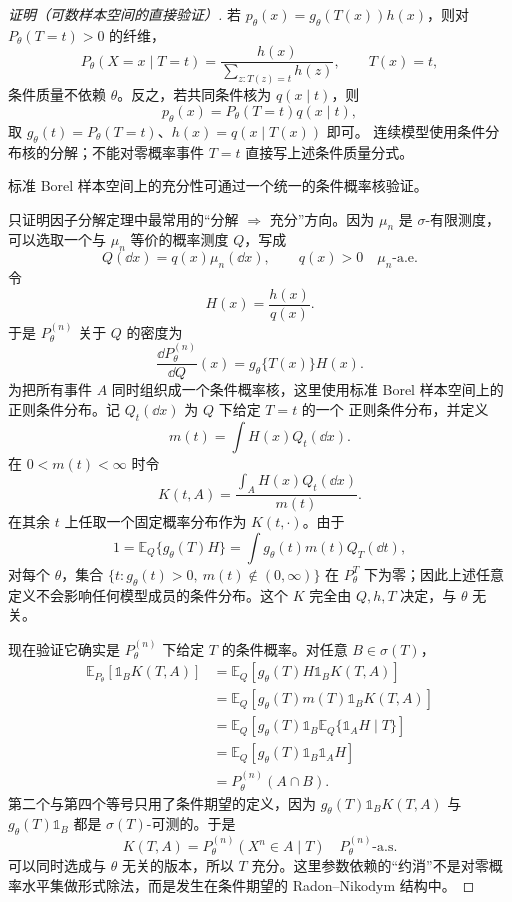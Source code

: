 \begin{proof}[证明（可数样本空间的直接验证）]
若 $p_\theta(x)=g_\theta(T(x))h(x)$，则对 $P_\theta(T=t)>0$ 的纤维，
\[
 P_\theta(X=x\mid T=t)=\frac{h(x)}{\sum_{z:T(z)=t}h(z)},\qquad T(x)=t,
\]
条件质量不依赖 $\theta$。反之，若共同条件核为 $q(x\mid t)$，则
\[
 p_\theta(x)=P_\theta(T=t)q(x\mid t),
\]
取 $g_\theta(t)=P_\theta(T=t)$、$h(x)=q(x\mid T(x))$ 即可。
连续模型使用条件分布核的分解；不能对零概率事件 $T=t$ 直接写上述条件质量分式。

标准 Borel 样本空间上的充分性可通过一个统一的条件概率核验证。

只证明因子分解定理中最常用的“分解 $\Rightarrow$ 充分”方向。因为 $\mu_n$ 是 $\sigma$-有限测度，可以选取一个与 $\mu_n$ 等价的概率测度 $Q$，写成
\[
 Q(\dd x)=q(x)\mu_n(\dd x),
 \qquad q(x)>0\quad \mu_n\text{-a.e.}
\]
令
\[
 H(x)=\frac{h(x)}{q(x)}.
\]
于是 $P_\theta^{(n)}$ 关于 $Q$ 的密度为
\[
 \frac{\dd P_\theta^{(n)}}{\dd Q}(x)
 =g_\theta\{T(x)\}H(x).
\]
为把所有事件 $A$ 同时组织成一个条件概率核，这里使用标准 Borel 样本空间上的 正则条件分布。记 $Q_t(\dd x)$ 为 $Q$ 下给定 $T=t$ 的一个 正则条件分布，并定义
\[
 m(t)=\int H(x)Q_t(\dd x).
\]
在 $0<m(t)<\infty$ 时令
\[
 K(t,A)
 =\frac{\int_AH(x)Q_t(\dd x)}{m(t)}.
\]
在其余 $t$ 上任取一个固定概率分布作为 $K(t,\cdot)$。由于
\[
 1=\mathbb E_Q\{g_\theta(T)H\}
 =\int g_\theta(t)m(t)Q_T(\dd t),
\]
对每个 $\theta$，集合 $\{t:g_\theta(t)>0,\ m(t)\notin(0,\infty)\}$ 在 $P_\theta^T$ 下为零；因此上述任意定义不会影响任何模型成员的条件分布。这个 $K$ 完全由 $Q,h,T$ 决定，与 $\theta$ 无关。

现在验证它确实是 $P_\theta^{(n)}$ 下给定 $T$ 的条件概率。对任意 $B\in\sigma(T)$，
\begin{align*}
 \mathbb E_{P_\theta}[\mathds{1}_B K(T,A)]
 &=\mathbb E_Q\!\left[
 g_\theta(T)H\mathds{1}_BK(T,A)
 \right]\\
 &=\mathbb E_Q\!\left[
 g_\theta(T)m(T)\mathds{1}_BK(T,A)
 \right]\\
 &=\mathbb E_Q\!\left[
 g_\theta(T)\mathds{1}_B
 \mathbb E_Q\{\mathds{1}_AH\mid T\}
 \right]\\
 &=\mathbb E_Q\!\left[
 g_\theta(T)\mathds{1}_B\mathds{1}_AH
 \right]\\
 &=P_\theta^{(n)}(A\cap B).
\end{align*}
第二个与第四个等号只用了条件期望的定义，因为 $g_\theta(T)\mathds{1}_BK(T,A)$ 与 $g_\theta(T)\mathds{1}_B$ 都是 $\sigma(T)$-可测的。于是
\[
 K(T,A)
 =P_\theta^{(n)}(X^n\in A\mid T)
 \quad P_\theta^{(n)}\text{-a.s.}
\]
可以同时选成与 $\theta$ 无关的版本，所以 $T$ 充分。这里参数依赖的“约消”不是对零概率水平集做形式除法，而是发生在条件期望的 Radon--Nikodym 结构中。
\end{proof}


